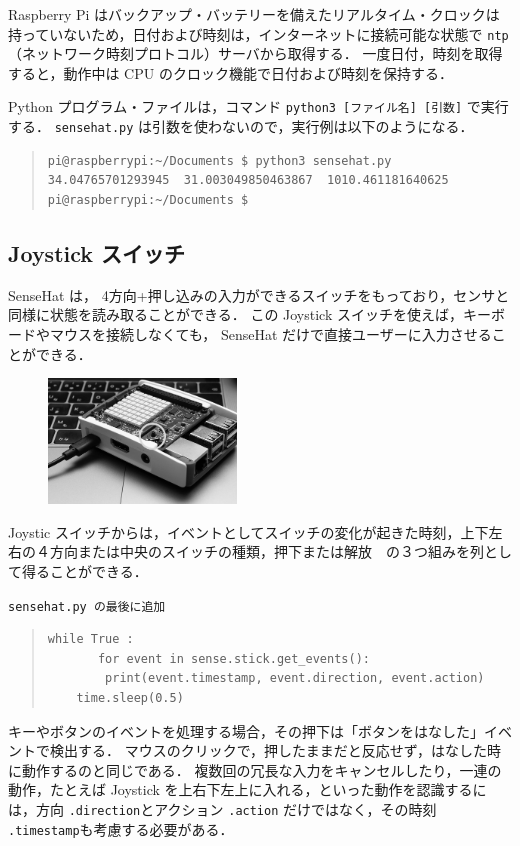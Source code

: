 \documentclass[11pt,a4,epsf]{article}
\begin{document}
Raspberry Pi はバックアップ・バッテリーを備えたリアルタイム・クロックは持っていないため，日付および時刻は，インターネットに接続可能な状態で \verb+ntp+ （ネットワーク時刻プロトコル）サーバから取得する．
一度日付，時刻を取得すると，動作中は CPU のクロック機能で日付および時刻を保持する．

Python プログラム・ファイルは，コマンド \verb+python3 [ファイル名] [引数]+ で実行する．
\verb+sensehat.py+ は引数を使わないので，実行例は以下のようになる．
\begin{quote}
\small
\begin{verbatim}
pi@raspberrypi:~/Documents $ python3 sensehat.py 
34.04765701293945  31.003049850463867  1010.461181640625 
pi@raspberrypi:~/Documents $ 
\end{verbatim}
\end{quote}

\subsection{Joystick スイッチ}
SenseHat は， 4方向+押し込みの入力ができるスイッチをもっており，センサと同様に状態を読み取ることができる．
この Joystick スイッチを使えば，キーボードやマウスを接続しなくても， SenseHat だけで直接ユーザーに入力させることができる．

\begin{figure}
\centering
\includegraphics[width=5cm]{joystick.jpg}
\end{figure}

Joystic スイッチからは，イベントとしてスイッチの変化が起きた時刻，上下左右の４方向または中央のスイッチの種類，押下または解放　の３つ組みを列として得ることができる．
\begin{itembox}[l]{\tt sensehat.py の最後に追加}
\begin{quote}
\small
\begin{verbatim}
while True :
       for event in sense.stick.get_events():
        print(event.timestamp, event.direction, event.action)
    time.sleep(0.5)
\end{verbatim}
\end{quote}
\end{itembox}
キーやボタンのイベントを処理する場合，その押下は「ボタンをはなした」イベントで検出する．
マウスのクリックで，押したままだと反応せず，はなした時に動作するのと同じである．
複数回の冗長な入力をキャンセルしたり，一連の動作，たとえば Joystick を上右下左上に入れる，といった動作を認識するには，方向 \verb+.direction+とアクション \verb+.action+ だけではなく，その時刻 \verb+.timestamp+も考慮する必要がある．
\end{document}
